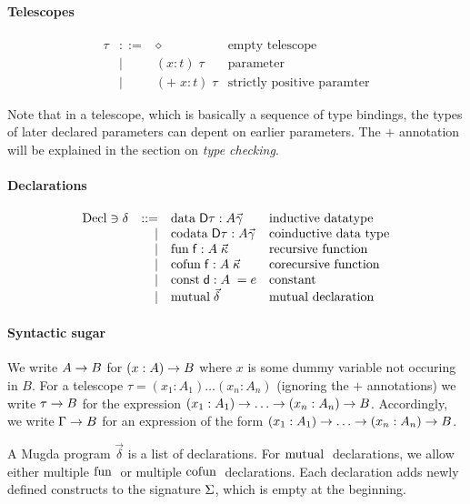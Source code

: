 \paragraph*{Telescopes}
\[
\begin{array}{lrll}
\tau & ::= & \diamond & \mbox{empty telescope}\\
& \mid & ( x : t ) \; \tau & \mbox{parameter}\\
& \mid & ( + \; x : t ) \; \tau & \mbox{strictly positive paramter}
\end{array}
\]

Note that in a telescope, which is basically a sequence of type bindings, the types of later declared parameters can depent on earlier parameters. The $+$ annotation will be explained in the section on \emph{type checking}. 

\paragraph*{Declarations}
\[
\begin{array}{lrll}
\mathrm{Decl} \ni \delta & ::= & \mathrm{data}\; \mathsf{D} \tau : A \vec{\gamma} & \mbox{inductive datatype}\\ 
& \mid & \mathrm{codata}\; \mathsf{D} \tau : A \vec{\gamma} & \mbox{coinductive data type} \\
& \mid & \mathrm{fun}\; \mathsf{f} : A \; \vec{\kappa} & \mbox{recursive function}\\
& \mid & \mathrm{cofun}\; \mathsf{f} : A \; \vec{\kappa} & \mbox{corecursive function}\\ 
& \mid & \mathrm{const}\; \mathsf{d} : A \; = e & \mbox{constant}\\
& \mid & \mathrm{mutual}\; \vec{\delta} & \mbox{mutual declaration}
\end{array}
\]



\paragraph*{Syntactic sugar}
We write $A \rightarrow B$ for $( x : A ) \rightarrow{B}$ where $x$ is some dummy variable not occuring in $B$.
For a telescope $\tau = (x_1 : A_1) \ldots (x_n : A_n)$ (ignoring the $+$ annotations) we write
$\tau \rightarrow B$ for the expression  $( x_1 : A_1 ) \rightarrow{\ldots \rightarrow( x_n : A_n ) \rightarrow{B}}$.
Accordingly, we write $\Gamma \rightarrow B$ for an expression of the form $( x_1 : A_1 ) \rightarrow{\ldots \rightarrow( x_n : A_n ) \rightarrow{B}}$.

A Mugda program $\vec{\delta}$ is a list of declarations.
For $\mathrm{mutual}\;$ declarations, we allow either multiple $\mathrm{fun}\;$ or multiple $\mathrm{cofun}\;$ declarations.
Each declaration adds newly defined constructs to the signature $\mathrm{\Sigma}$, which is empty at the beginning.

